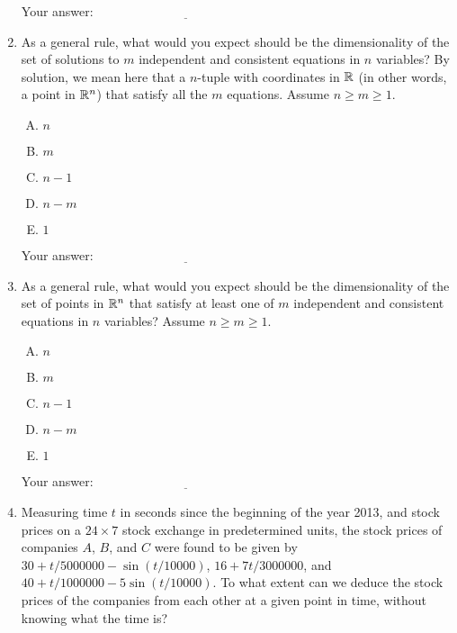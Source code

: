 \documentclass[10pt]{amsart}
\begin{document}
\begin{enumerate}
  \vspace{0.1in}
  Your answer: $\underline{\qquad\qquad\qquad\qquad\qquad\qquad\qquad}$
  \vspace{0.1in}

\item As a general rule, what would you expect should be the
  dimensionality of the set of solutions to $m$ independent and
  consistent equations in $n$ variables? By solution, we mean here
  that a $n$-tuple with coordinates in $\mathbb{R}$ (in other words, a point
  in $\mathbb{R}^n$) that satisfy all the $m$ equations. Assume $n \ge m \ge
  1$.

  \begin{enumerate}[(A)]
  \item $n$
  \item $m$
  \item $n - 1$
  \item $n - m$
  \item $1$
  \end{enumerate} 

  \vspace{0.1in}
  Your answer: $\underline{\qquad\qquad\qquad\qquad\qquad\qquad\qquad}$
  \vspace{0.1in}

\item As a general rule, what would you expect should be the
  dimensionality of the set of points in $\mathbb{R}^n$ that satisfy at least
  one of $m$ independent and consistent equations in $n$ variables?
  Assume $n \ge m \ge 1$.

  \begin{enumerate}[(A)]
  \item $n$
  \item $m$
  \item $n - 1$
  \item $n - m$
  \item $1$ 
  \end{enumerate} 

  \vspace{0.1in}
  Your answer: $\underline{\qquad\qquad\qquad\qquad\qquad\qquad\qquad}$
  \vspace{0.1in}


\item Measuring time $t$ in seconds since the beginning of the year
  2013, and stock prices on a $24 \times 7$ stock exchange in
  predetermined units, the stock prices of companies $A$, $B$, and $C$
  were found to be given by $30 + t/5000000 - \sin(t/10000)$, $16 +
  7t/3000000$, and $40 + t/1000000 - 5\sin(t/10000)$. To what extent
  can we deduce the stock prices of the companies from each other at a
  given point in time, without knowing what the time is?


\end{enumerate}
\end{document}
